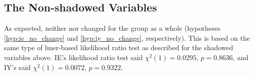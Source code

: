     
\subsection{The Non-shadowed Variables}
\label{ssec:nonshadResults}
    As expected, neither \textipa{[e]/[iE]} nor \textipa{[i]/[y]} changed for the group as a whole (hypotheses \ref{hyp:ie_no_change} and \ref{hyp:iy_no_change}, respectively). This is based on the same type of lmer-based likelihood ratio test as described for the shadowed variables above. IE's likelihood ratio test said $\chi^2 (1) = 0.0295$, $p = 0.8636$, and IY's said $\chi^2 (1) = 0.0072$, $p = 0.9322$. 
    
